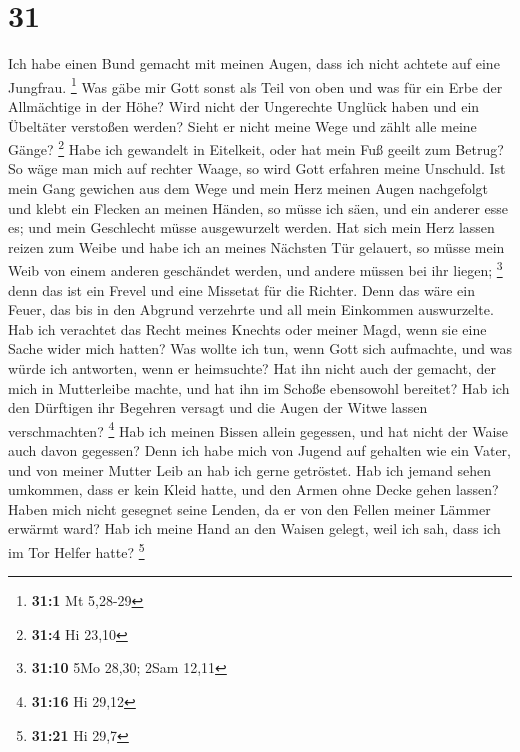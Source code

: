 \hypertarget{section-7}{%
\section{31}\label{section-7}}

 Ich habe einen Bund gemacht mit meinen Augen, dass ich
nicht achtete auf eine Jungfrau. \footnote{\textbf{31:1} Mt 5,28-29}
 Was gäbe mir Gott sonst als Teil von oben und was für ein
Erbe der Allmächtige in der Höhe?  Wird nicht der
Ungerechte Unglück haben und ein Übeltäter verstoßen werden?
 Sieht er nicht meine Wege und zählt alle meine Gänge?
\footnote{\textbf{31:4} Hi 23,10}  Habe ich gewandelt in
Eitelkeit, oder hat mein Fuß geeilt zum Betrug?  So wäge
man mich auf rechter Waage, so wird Gott erfahren meine Unschuld.
 Ist mein Gang gewichen aus dem Wege und mein Herz meinen
Augen nachgefolgt und klebt ein Flecken an meinen Händen, 
so müsse ich säen, und ein anderer esse es; und mein Geschlecht müsse
ausgewurzelt werden.  Hat sich mein Herz lassen reizen zum
Weibe und habe ich an meines Nächsten Tür gelauert,  so
müsse mein Weib von einem anderen geschändet werden, und andere müssen
bei ihr liegen; \footnote{\textbf{31:10} 5Mo 28,30; 2Sam 12,11}
 denn das ist ein Frevel und eine Missetat für die
Richter.  Denn das wäre ein Feuer, das bis in den Abgrund
verzehrte und all mein Einkommen auswurzelte.  Hab ich
verachtet das Recht meines Knechts oder meiner Magd, wenn sie eine Sache
wider mich hatten?  Was wollte ich tun, wenn Gott sich
aufmachte, und was würde ich antworten, wenn er heimsuchte?
 Hat ihn nicht auch der gemacht, der mich in Mutterleibe
machte, und hat ihn im Schoße ebensowohl bereitet?  Hab
ich den Dürftigen ihr Begehren versagt und die Augen der Witwe lassen
verschmachten? \footnote{\textbf{31:16} Hi 29,12}  Hab
ich meinen Bissen allein gegessen, und hat nicht der Waise auch davon
gegessen?  Denn ich habe mich von Jugend auf gehalten wie
ein Vater, und von meiner Mutter Leib an hab ich gerne getröstet.
 Hab ich jemand sehen umkommen, dass er kein Kleid hatte,
und den Armen ohne Decke gehen lassen?  Haben mich nicht
gesegnet seine Lenden, da er von den Fellen meiner Lämmer erwärmt ward?
 Hab ich meine Hand an den Waisen gelegt, weil ich sah,
dass ich im Tor Helfer hatte? \footnote{\textbf{31:21} Hi 29,7}

